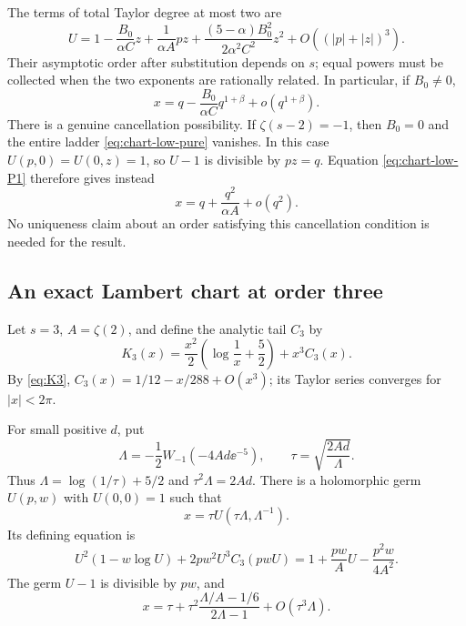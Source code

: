 The terms of total Taylor degree at most two are
\begin{equation}\label{eq:chart-low-first}
 U=1-\frac{B_0}{\alpha C}z+\frac1{\alpha A}pz
 +\frac{(5-\alpha)B_0^2}{2\alpha^2C^2}z^2
 +O((|p|+|z|)^3).
\end{equation}
Their asymptotic order after substitution depends on $s$; equal powers
must be collected when the two exponents are rationally related.
In particular, if $B_0\ne0$,
\[
 x=q-\frac{B_0}{\alpha C}q^{1+\beta}+o(q^{1+\beta}).
\]
There is a genuine cancellation possibility.  If $\zeta(s-2)=-1$,
then $B_0=0$ and the entire ladder \eqref{eq:chart-low-pure} vanishes.
In this case $U(p,0)=U(0,z)=1$, so $U-1$ is divisible by $pz=q$.
Equation \eqref{eq:chart-low-P1} therefore gives instead
\begin{equation}\label{eq:chart-low-cancellation}
 x=q+\frac{q^2}{\alpha A}+o(q^2).
\end{equation}
No uniqueness claim about an order satisfying this cancellation condition
is needed for the result.

\subsection{An exact Lambert chart at order three}

Let $s=3$, $A=\zeta(2)$, and define the analytic tail $C_3$ by
\[
 K_3(x)=\frac{x^2}{2}\left(\log\frac1x+\frac52\right)+x^3C_3(x).
\]
By \eqref{eq:K3},
$C_3(x)=1/12-x/288+O(x^3)$; its Taylor series converges for
$|x|<2\pi$.

\begin{theorem}
\label{thm:chart-three}
For small positive $d$, put
\begin{equation}\label{eq:three-Lambert-core}
 \Lambda=-\frac12W_{-1}(-4Ad\ee^{-5}),\qquad
 \tau=\sqrt{\frac{2Ad}{\Lambda}}.
\end{equation}
Thus $\Lambda=\log(1/\tau)+5/2$ and $\tau^2\Lambda=2Ad$.
There is a holomorphic germ $U(p,w)$ with $U(0,0)=1$ such that
\begin{equation}\label{eq:three-chart-inverse}
 x=\tau U(\tau\Lambda,\Lambda^{-1}).
\end{equation}
Its defining equation is
\begin{equation}\label{eq:three-chart-equation}
 U^2(1-w\log U)+2pw^2U^3C_3(pwU)
 =1+\frac{pw}{A}U-\frac{p^2w}{4A^2}.
\end{equation}
The germ $U-1$ is divisible by $pw$, and
\begin{equation}\label{eq:three-chart-correction}
 x=\tau+\tau^2\frac{\Lambda/A-1/6}{2\Lambda-1}
       +O(\tau^3\Lambda).
\end{equation}
\end{theorem}

